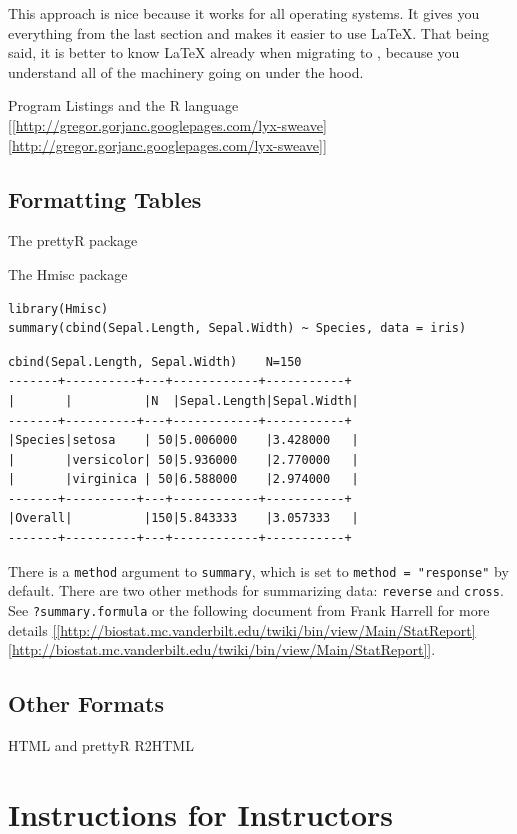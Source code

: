 \documentclass[captions=tableheading]{scrbook}
\begin{document}
This approach is nice because it works for all operating  systems. It gives you everything from the last section and makes it easier to use \LaTeX{}. That being said, it is better to know \LaTeX{} already when migrating to \LyX{}, because you understand all of the machinery going on under the hood.

Program Listings and the \textsf{R} language
\url{[[http://gregor.gorjanc.googlepages.com/lyx-sweave][http://gregor.gorjanc.googlepages.com/lyx-sweave]]}
\section{Formatting Tables \label{sec:Formatting-Tables}}
\label{sec-22-3}


The prettyR package 

The Hmisc package


\begin{verbatim}
library(Hmisc)
summary(cbind(Sepal.Length, Sepal.Width) ~ Species, data = iris)
\end{verbatim}


\begin{verbatim}
cbind(Sepal.Length, Sepal.Width)    N=150
-------+----------+---+------------+-----------+
|       |          |N  |Sepal.Length|Sepal.Width|
-------+----------+---+------------+-----------+
|Species|setosa    | 50|5.006000    |3.428000   |
|       |versicolor| 50|5.936000    |2.770000   |
|       |virginica | 50|6.588000    |2.974000   |
-------+----------+---+------------+-----------+
|Overall|          |150|5.843333    |3.057333   |
-------+----------+---+------------+-----------+
\end{verbatim}

There is a \texttt{method} argument to \texttt{summary}, which is set to \texttt{method = "response"} by default. There are two other methods for summarizing data: \texttt{reverse} and \texttt{cross}. See \texttt{?summary.formula} or the following document from Frank Harrell for more details \url{[[http://biostat.mc.vanderbilt.edu/twiki/bin/view/Main/StatReport][http://biostat.mc.vanderbilt.edu/twiki/bin/view/Main/StatReport]]}.
\section{Other Formats \label{sec:Other-Formats}}
\label{sec-22-4}


HTML and prettyR
R2HTML
\chapter{Instructions for Instructors}
\label{sec-23}
\end{document}
